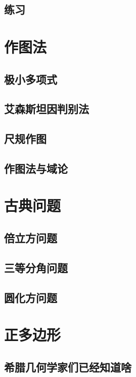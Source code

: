 \documentclass[cn,fancy,blue,11pt]{elegantbook}
\begin{document}
\section{练习}




\appendix

\chapter{作图法}

\section{极小多项式}

\section{艾森斯坦因判别法}

\section{尺规作图}

\section{作图法与域论}

\chapter{古典问题}

\section{倍立方问题}

\section{三等分角问题}

\section{圆化方问题}

\chapter{正多边形}

\section{希腊几何学家们已经知道啥}
\end{document}
